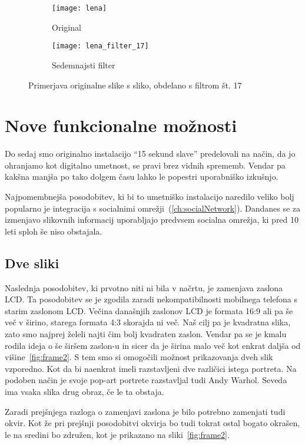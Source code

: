 \begin{figure}[!ht]
    \centering
    \begin{subfigure}[b]{0.4\textwidth}
        \texttt{[image: lena]}
        \caption{Original}
    \end{subfigure}
    \begin{subfigure}[b]{0.4\textwidth}
        \texttt{[image: lena\_filter\_17]}
        \caption{Sedemnajsti filter}
    \end{subfigure}
    \caption{Primerjava originalne slike s sliko, obdelano s filtrom št. 17}
    \label{fig:lena_filter_17}
\end{figure}


\chapter{Nove funkcionalne možnosti}
\label{ch:novosti}
Do sedaj smo originalno instalacijo ``15 sekund slave'' predelovali na način,
da jo ohranjamo kot digitalno umetnost, se pravi brez vidnih sprememb. Vendar
pa kakšna manjša po tako dolgem času lahko le popestri uporabniško izkušnjo.

Najpomembnejša posodobitev, ki bi to umetniško instalacijo naredilo veliko
bolj popularno je integracija s socialnimi omrežji~(\ref{ch:socialNetwork}).
Dandanes se za izmenjavo slikovnih informacij uporabljajo predvsem socialna
omrežja, ki pred 10 leti sploh še niso obstajala.


\section{Dve sliki}
Naslednja posodobitev, ki prvotno niti ni bila v načrtu, je zamenjava zaslona
LCD. Ta posodobitev se je zgodila zaradi nekompatibilnosti mobilnega telefona
s starim zaslonom LCD. Večina današnjih zaslonov LCD je formata 16:9 ali pa še
več v širino, starega formata 4:3 skorajda ni več. Naš cilj pa je kvadratna
slika, zato smo najprej želeli najti čim bolj kvadraten zaslon. Vendar pa se
je kmalu rodila ideja o še širšem zaslon-u in sicer da je širina malo več kot
enkrat daljša od višine~\ref{fig:frame2}. S tem smo si omogočili možnost
prikazovanja dveh slik vzporedno. Kot da bi naenkrat imeli razstavljeni dve
različici istega portreta. Na podoben način je svoje pop-art portrete
razstavljal tudi Andy Warhol. Seveda ima vsaka slika drug obraz, če le ta
obstaja.

Zaradi prejšnjega razloga o zamenjavi zaslona je bilo potrebno zamenjati tudi
okvir. Kot že pri prejšnji posodobitvi okvirja bo tudi tokrat ostal bogato
okrašen, le na sredini bo združen, kot je prikazano na sliki~\ref{fig:frame2}.


